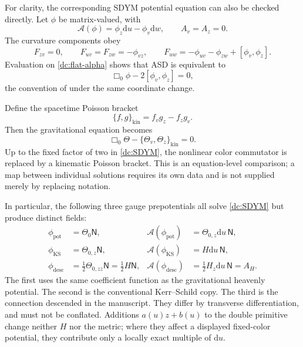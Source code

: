 \documentclass[11pt]{article}
\numberwithin{equation}{section}
\theoremstyle{remark}
\newcommand{\dd}{\mathrm d}
\newcommand{\NN}{\mathsf N}
\begin{document}
For clarity, the corresponding SDYM potential equation can also be
checked directly. Let $\phi$ be matrix-valued, with
\begin{equation}\label{dc:YMpotential}
 \mathcal A(\phi)=\phi_z\dd u-\phi_v\dd w,
 \qquad A_v=A_z=0.
\end{equation}
The curvature components obey
\begin{equation}
 F_{zv}=0,\qquad F_{uv}=F_{zw}=-\phi_{vz},\qquad
 F_{uw}=-\phi_{uv}-\phi_{zw}+[\phi_v,\phi_z].
\end{equation}
Evaluation on \eqref{dc:flat-alpha} shows that ASD is equivalent to
\begin{equation}\label{dc:SDYM}
 \Box_0\phi-2[\phi_v,\phi_z]=0,
\end{equation}
the convention of \cite[Eqs.~(2.4)--(2.8)]{DC-BGS} under the same
coordinate change.

Define the spacetime Poisson bracket
\begin{equation}\label{dc:kinbracket}
 \{f,g\}_{\mathrm{kin}}=f_vg_z-f_zg_v.
\end{equation}
Then the gravitational equation becomes
\begin{equation}
 \Box_0\Theta-\{\Theta_v,\Theta_z\}_{\mathrm{kin}}=0.
\end{equation}
Up to the fixed factor of two in \eqref{dc:SDYM}, the nonlinear color
commutator is replaced by a kinematic Poisson bracket. This is an
equation-level comparison; a map between individual solutions requires
its own data and is not supplied merely by replacing notation.

In particular, the following three gauge prepotentials all solve
\eqref{dc:SDYM} but produce distinct fields:
\begin{align}
 \phi_{\mathrm{pot}}&=\Theta_0\NN,
 &\mathcal A(\phi_{\mathrm{pot}})&=\Theta_{0,z}\dd u\,\NN,
 \label{dc:potential-copy}\\
 \phi_{\mathrm{KS}}&=\Theta_{0,z}\NN,
 &\mathcal A(\phi_{\mathrm{KS}})&=H\dd u\,\NN,
 \label{dc:KS-potential}\\
 \phi_{\mathrm{desc}}&=\frac12\Theta_{0,zz}\NN=\frac12H\NN,
 &\mathcal A(\phi_{\mathrm{desc}})&=\frac12H_z\dd u\,\NN=A_H.
 \label{dc:desc-potential}
\end{align}
The first uses the same coefficient function as the gravitational
heavenly potential. The second is the conventional Kerr--Schild copy.
The third is the connection descended in the manuscript. They differ
by transverse differentiation, and must not be conflated. Additions
$a(u)z+b(u)$ to the double primitive change neither $H$ nor the metric;
where they affect a displayed fixed-color potential, they contribute
only a locally exact multiple of $\dd u$.
\end{document}
